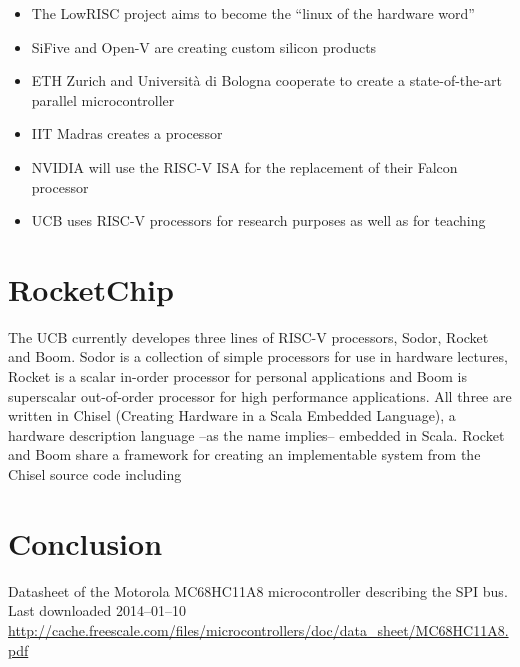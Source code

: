 \documentclass[journal]{IEEEtran}
\begin{document}
\begin{itemize}
	\item The LowRISC project aims to become the ``linux of the hardware word''
	\item SiFive and Open-V are creating custom silicon products
	\item ETH Zurich and Università di Bologna cooperate to create a state-of-the-art parallel microcontroller
	\item IIT Madras creates a processor
	\item NVIDIA will use the RISC-V ISA for the replacement of their Falcon processor
	\item UCB uses RISC-V processors for research purposes as well as for teaching
\end{itemize}


\section{RocketChip}
The UCB currently developes three lines of RISC-V processors, Sodor, Rocket and Boom.
Sodor is a collection of simple processors for use in hardware lectures, Rocket is a scalar in-order processor for personal applications and Boom is superscalar out-of-order processor for high performance applications.
All three are written in Chisel (Creating Hardware in a Scala Embedded Language), a hardware description language --as the name implies-- embedded in Scala.
Rocket and Boom share a framework for creating an implementable system from the Chisel source code including 

















\section{Conclusion}


\bigskip

\begin{thebibliography}{1}

		Datasheet of the Motorola MC68HC11A8 microcontroller describing the SPI bus.\\
		Last downloaded 2014--01--10\\
		\url{http://cache.freescale.com/files/microcontrollers/doc/data_sheet/MC68HC11A8.pdf}
		\medskip


\end{thebibliography}
\enlargethispage{-5in}
\end{document}

